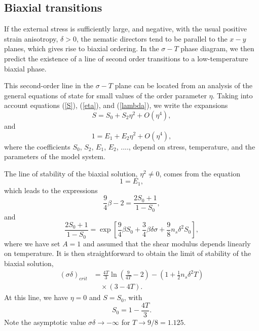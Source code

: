 \documentclass[aps,pre,reprint,amsmath,amssymbols,superscriptaddress,
nofootinbib]{revtex4-1}
\begin{document}
\subsection{Biaxial transitions}

If the external stress is sufficiently large, and negative, with the usual
positive strain anisotropy, $\delta>0$, the nematic directors tend to be
parallel to the $x-y$ planes, which gives rise to biaxial ordering. In the
$\sigma-T$ phase diagram, we then predict the existence of a line of second
order transitions to a low-temperature biaxial phase.

This second-order line in the $\sigma-T$ plane can be located from an analysis
of the general equations of state for small values of the order parameter
$\eta$. Taking into account equations (\ref{S}), (\ref{eta}), and
(\ref{lambda}), we write the expansions%
\begin{equation}
S=S_{0}+S_{2}\eta^{2}+O\left(  \eta^{4}\right)  ,
\end{equation}
and%
\begin{equation}
1=E_{1}+E_{2}\eta^{2}+O\left(  \eta^{4}\right)  ,
\end{equation}
where the coefficients $S_{0}$, $S_{2}$, $E_{1}$, $E_{2}$, ...., depend on
stress, temperature, and the parameters of the model system.

The line of stability of the biaxial solution, $\eta^{2}\neq0$, comes from the
equation%
\begin{equation}
1=E_{1},\label{stability}%
\end{equation}
which leads to the expressions%
\begin{equation}
\frac{9}{4}\beta-2=\frac{2S_{0}+1}{1-S_{0}},
\end{equation}
and%
\begin{equation}
\frac{2S_{0}+1}{1-S_{0}}=\exp\left[  \frac{9}{4}\beta S_{0}+\frac{3}{4}%
\beta\delta\sigma+\frac{9}{8}n_{s}\delta^{2}S_{0}\right]  ,
\end{equation}
where we have set $A=1$ and assumed that the shear modulus depends linearly on
temperature. It is then straightforward to obtain the limit of stability of
the biaxial solution,%
\begin{align}
\left(  \sigma\delta\right)  _{crit} &=\frac{4T}{3}\ln\left(  \frac{9}%
{4T}-2\right)
-\left(  1+\frac{1}{2}n_{s}\delta^{2}T\right)
\nonumber \\ \quad & \quad \times
\left(
3-4T\right).
\end{align}
At this line, we have $\eta=0$ and $S=S_{0}$, with%
\begin{equation}
S_{0}=1-\frac{4T}{3}.\label{S0}%
\end{equation}
Note the asymptotic value $\sigma\delta\rightarrow-\infty$ for $T\rightarrow
9/8=1.125$.
\end{document}
